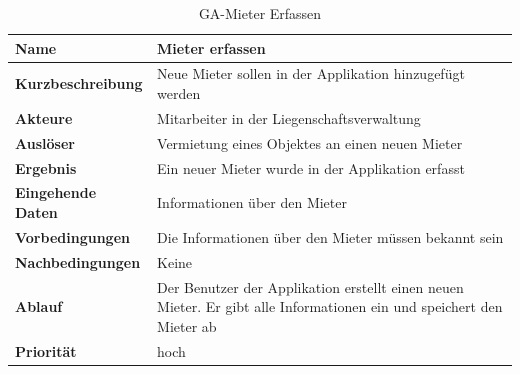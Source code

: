 \begin{table}[H]
  \centering
  \settowidth{}
  \setlength\extrarowheight{2pt}
  \begin{tabulary}{1.0\textwidth}{|a|m{12cm}|}
    \hline
    \textbf{Name}& Mieter erfassen\\
    \hline 
    \textbf{Kurzbeschreibung} & Neue Mieter sollen in der Applikation hinzugefügt werden\\
    \hline
    \textbf{Akteure} & Mitarbeiter in der Liegenschaftsverwaltung\\
    \hline
    \textbf{Auslöser} & Vermietung eines Objektes an einen neuen Mieter\\
    \hline
    \textbf{Ergebnis} & Ein neuer Mieter wurde in der Applikation erfasst\\
    \hline
    \textbf{Eingehende Daten} & Informationen über den Mieter\\
    \hline
    \textbf{Vorbedingungen} & Die Informationen über den Mieter müssen bekannt sein\\
    \hline
    \textbf{Nachbedingungen} & Keine\\
    \hline
    \textbf{Ablauf} & Der Benutzer der Applikation erstellt einen neuen Mieter. Er gibt alle Informationen ein und speichert den Mieter ab\\
    \hline
    \textbf{Priorität} & hoch\\
    \hline
  \end{tabulary}
  \caption{GA-Mieter Erfassen}
\end{table}

